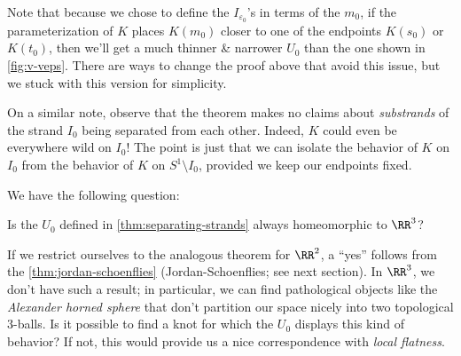 \begin{remark}
  Note that because we chose to define the $I_{\varepsilon_0}$'s in
  terms of the $m_0$, if the parameterization of $K$ places $K(m_0)$
  closer to one of the endpoints $K(s_0)$ or $K(t_0)$, then we'll get
  a much thinner \& narrower $U_0$ than the one shown in
  \cref{fig:v-veps}. There are ways to change the proof above that
  avoid this issue, but we stuck with this version for simplicity.

  On a similar note, observe that the theorem makes no claims about
  \emph{substrands} of the strand $I_0$ being separated from each
  other. Indeed, $K$ could even be everywhere wild on $I_0$! The point
  is just that we can isolate the behavior of $K$ on $I_0$ from the
  behavior of $K$ on $S^1 \setminus I_0$, provided we keep our
  endpoints fixed.
\end{remark}
We have the following question:
\begin{question}
  Is the $U_0$ defined in \cref{thm:separating-strands} always
  homeomorphic to $\RR^3$?
\end{question}
If we restrict ourselves to the analogous theorem for $\RR^2$, a
``yes'' follows from the \cref{thm:jordan-schoenflies}
(Jordan-Schoenflies; see next section). In $\RR^3$, we don't have such
a result; in particular, we can find pathological objects like the
\emph{Alexander horned sphere} that don't partition our space nicely
into two topological $3$-balls. Is it possible to find a knot for
which the $U_0$ displays this kind of behavior? If not, this would
provide us a nice correspondence with \emph{local flatness}.


